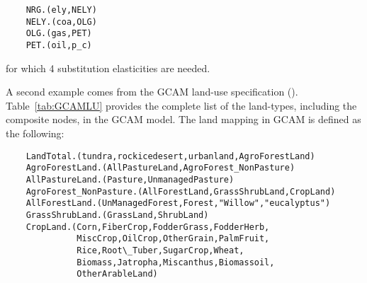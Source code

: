 \begin{verbatim}
    NRG.(ely,NELY)
    NELY.(coa,OLG)
    OLG.(gas,PET)
    PET.(oil,p_c)
\end{verbatim}

\noindent for which 4 substitution elasticities are needed.

A second example comes from the GCAM land-use specification
(\cite{GCAM2011b}). Table~\ref{tab:GCAMLU} provides the
complete list of the
land-types, including the composite nodes, in the GCAM
model. The land mapping in GCAM is defined as the following:

\begin{verbatim}
    LandTotal.(tundra,rockicedesert,urbanland,AgroForestLand)
    AgroForestLand.(AllPastureLand,AgroForest_NonPasture)
    AllPastureLand.(Pasture,UnmanagedPasture)
    AgroForest_NonPasture.(AllForestLand,GrassShrubLand,CropLand)
    AllForestLand.(UnManagedForest,Forest,"Willow","eucalyptus")
    GrassShrubLand.(GrassLand,ShrubLand)
    CropLand.(Corn,FiberCrop,FodderGrass,FodderHerb,
              MiscCrop,OilCrop,OtherGrain,PalmFruit,
              Rice,Root\_Tuber,SugarCrop,Wheat,
              Biomass,Jatropha,Miscanthus,Biomassoil,
              OtherArableLand)
\end{verbatim}


